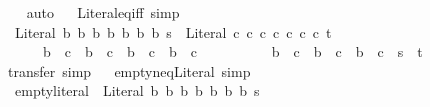 \begin{isabellebody}
%
\isadelimproof
\ \ %
\endisadelimproof
%
\isatagproof
{}\isamarkupfalse%
\ auto\isanewline
\isanewline
{}%
\endisatagproof
{\isafoldproof}%
%
\isadelimproof
%
\endisadelimproof
\ \isamarkupfalse%
\ Literal{\isacharunderscore}{\kern0pt}eq{\isacharunderscore}{\kern0pt}iff\ {\isacharbrackleft}{\kern0pt}simp{\isacharbrackright}{\kern0pt}{\isacharcolon}{\kern0pt}\isanewline
\ \ {\isachardoublequoteopen}Literal\ b{}\ b{}\ b{}\ b{}\ b{}\ b{}\ b{}\ s\ {\isacharequal}{\kern0pt}\ Literal\ c{}\ c{}\ c{}\ c{}\ c{}\ c{}\ c{}\ t\isanewline
\ \ \ \ \ {\isasymlongleftrightarrow}\ {\isacharparenleft}{\kern0pt}b{}\ {\isasymlongleftrightarrow}\ c{}{\isacharparenright}{\kern0pt}\ {\isasymand}\ {\isacharparenleft}{\kern0pt}b{}\ {\isasymlongleftrightarrow}\ c{}{\isacharparenright}{\kern0pt}\ {\isasymand}\ {\isacharparenleft}{\kern0pt}b{}\ {\isasymlongleftrightarrow}\ c{}{\isacharparenright}{\kern0pt}\ {\isasymand}\ {\isacharparenleft}{\kern0pt}b{}\ {\isasymlongleftrightarrow}\ c{}{\isacharparenright}{\kern0pt}\isanewline
\ \ \ \ \ \ \ \ \ {\isasymand}\ {\isacharparenleft}{\kern0pt}b{}\ {\isasymlongleftrightarrow}\ c{}{\isacharparenright}{\kern0pt}\ {\isasymand}\ {\isacharparenleft}{\kern0pt}b{}\ {\isasymlongleftrightarrow}\ c{}{\isacharparenright}{\kern0pt}\ {\isasymand}\ {\isacharparenleft}{\kern0pt}b{}\ {\isasymlongleftrightarrow}\ c{}{\isacharparenright}{\kern0pt}\ {\isasymand}\ s\ {\isacharequal}{\kern0pt}\ t{\isachardoublequoteclose}\isanewline
%
\isadelimproof
\ \ %
\endisadelimproof
%
\isatagproof
{}\isamarkupfalse%
\ transfer\ simp\isanewline
\isanewline
{}%
\endisatagproof
{\isafoldproof}%
%
\isadelimproof
%
\endisadelimproof
\ \isamarkupfalse%
\ empty{\isacharunderscore}{\kern0pt}neq{\isacharunderscore}{\kern0pt}Literal\ {\isacharbrackleft}{\kern0pt}simp{\isacharbrackright}{\kern0pt}{\isacharcolon}{\kern0pt}\isanewline
\ \ {\isachardoublequoteopen}empty{\isacharunderscore}{\kern0pt}literal\ {\isasymnoteq}\ Literal\ b{}\ b{}\ b{}\ b{}\ b{}\ b{}\ b{}\ s{\isachardoublequoteclose}\isanewline
%
\isadelimproof
\ \ %
\endisadelimproof
%
\isatagproof
{}\isamarkupfalse%

\end{isabellebody}
